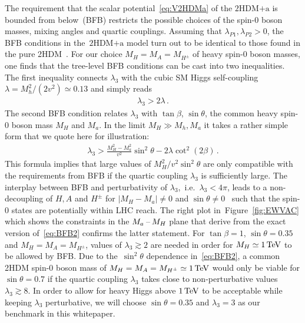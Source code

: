 \documentclass[a4paper, 11pt,notoc]{article}
\newcommand{\hdma}{\ensuremath{\textrm{2HDM+a}}\xspace}
\begin{document}
The requirement that the scalar potential~\eqref{eq:V2HDMa} of the \hdma  is bounded from below~(BFB) restricts the possible choices of the spin-0 boson masses, mixing angles and quartic couplings. Assuming that $\lambda_{P1}, \lambda_{P2} > 0$, the  BFB conditions in the~\hdma model turn out to be identical to those found in the pure 2HDM~\cite{Gunion:2002zf}. For our choice $M_H = M_A = M_{H^\pm}$ of heavy spin-0 boson masses, one finds that the tree-level BFB conditions can be cast into  two inequalities. The first inequality connects $\lambda_3$ with the cubic SM Higgs self-coupling $\lambda = M_h^2/(2 v^2) \simeq 0.13$ and simply reads   
\begin{align} \label{eq:BFB1}
\lambda_3 > 2 \lambda  \,.
\end{align}
The second BFB condition relates $\lambda_3$ with $\tan \beta$, $\sin \theta$, the common heavy  spin-0 boson  mass $M_H$ and $M_a$. In the limit $M_H \gg M_h, M_a$ it takes a rather simple form that we quote here for illustration: 
\begin{align} \label{eq:BFB2}
\lambda_3 > \frac{M_H^2 -M_a^2}{v^2} \sin^2 \theta  - 2 \lambda \cot^2 (2 \beta )  \,.
\end{align}
This formula implies that large values of $M_H^2/v^2 \sin^2 \theta$ are only compatible with the requirements from BFB if the quartic coupling $\lambda_3$ is sufficiently large.  The interplay between BFB and perturbativity of $\lambda_3$,~i.e.~$\lambda_3 < 4 \pi$, leads to a non-decoupling of $H, A$ and $H^\pm$ for $|M_H - M_a| \neq 0$ and $\sin \theta  \neq 0$~\cite{Goncalves:2016iyg} such that the spin-0 states are potentially within LHC reach. The right plot in~Figure~\ref{fig:EWVAC} which shows the constraints in the $M_{a}\hspace{0.5mm}$--$\hspace{0.5mm} M_H$ plane that derive from the exact version of~\eqref{eq:BFB2} confirms the latter statement. For $\tan \beta = 1$, $\sin \theta = 0.35$ and $M_H = M_A = M_{H^\pm}$, values of $\lambda_3 \gtrsim 2$ are needed in order for $M_H \simeq 1 \, {\rm TeV}$ to be allowed by BFB.  Due to the~$\sin^2 \theta$ dependence in~\eqref{eq:BFB2},   a common 2HDM  spin-0 boson  mass of $M_H = M_A = M_{H^\pm} \simeq 1 \, {\rm TeV}$ would only be viable for $\sin \theta = 0.7$ if the quartic coupling $\lambda_3$ takes close to non-perturbative values $\lambda_3 \gtrsim 8$. In order to allow for heavy Higgs above $1 \, {\rm TeV}$ to be acceptable while keeping $\lambda_3$ perturbative, we will choose $\sin \theta = 0.35$ and $\lambda_3 = 3$ as our benchmark in this whitepaper.  
\end{document}
